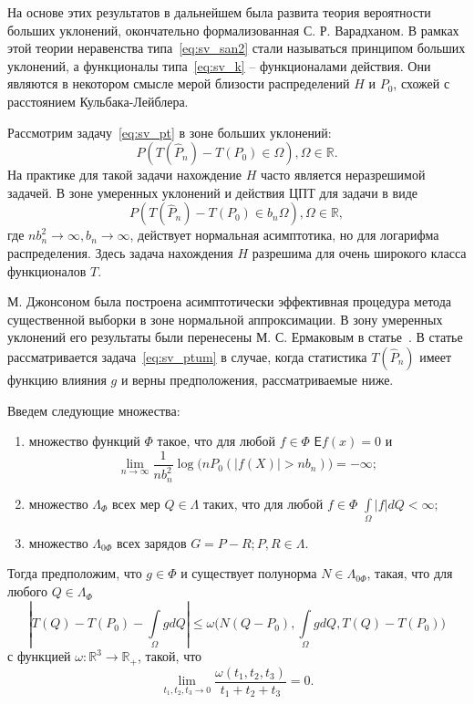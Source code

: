 \documentclass[12pt, specialist, subf, substylefile = spbu.rtx]{disser}
\newcommand{\Expect}{\mathsf{E}}
\begin{document}
На основе этих результатов в дальнейшем была развита теория вероятности больших уклонений, окончательно формализованная С. Р. Варадханом. В рамках этой теории неравенства типа~\eqref{eq:sv_san2} стали называться принципом больших уклонений, а функционалы типа~\eqref{eq:sv_k}
-- функционалами действия. Они являются в некотором смысле мерой близости распределений $H$ и $P_0$, схожей с расстоянием Кульбака-Лейблера.


Рассмотрим задачу~\eqref{eq:sv_pt} в зоне больших уклонений:
$$
P(T(\hat{P}_n)-T(P_0) \in \Omega), \Omega \in \mathbb{R}.
$$
На практике для такой задачи нахождение $H$ часто является неразрешимой задачей. В зоне умеренных уклонений и действия ЦПТ для задачи в виде
\begin{equation}\label{eq:sv_ptum}
P(T(\hat{P}_n)-T(P_0) \in b_n\Omega), \Omega \in \mathbb{R},
\end{equation}
где $nb_n^2 \to \infty, b_n \to \infty$, действует нормальная асимптотика, но для логарифма распределения. Здесь задача нахождения $H$ разрешима для очень широкого класса функционалов $T$.

М. Джонсоном была построена асимптотически эффективная процедура метода существенной выборки в зоне нормальной аппроксимации. В зону умеренных уклонений его результаты были перенесены М. С. Ермаковым в статье~\cite{Ermakov}. В статье рассматривается задача~\eqref{eq:sv_ptum} в случае, когда статистика $T(\hat{P}_n)$ имеет функцию влияния $g$ и верны предположения, рассматриваемые ниже.

Введем следующие множества: 
\begin{enumerate}
\item множество функций $\Phi$ такое, что для любой $f \in \Phi$  $\Expect f(x)=0 $ и
$$
\lim\limits_{n \to \infty} \frac{1}{nb_n^2} \log \big(nP_0(|f(X)|>nb_n)\big)=-\infty;
$$

\item множество $\Lambda_\Phi$ всех мер $Q \in \Lambda$ таких, что для любой $f \in \Phi$
$
\int\limits_{\Omega} |f| dQ < \infty;
$

\item множество $\Lambda_{0\Phi}$ всех зарядов $G=P-R; P, R \in \Lambda$.

\end{enumerate}

Тогда предположим, что $g \in \Phi$ и существует полунорма $N \in \Lambda_{0\Phi}$, такая, что для любого $Q \in \Lambda_\Phi$
$$
|T(Q)-T(P_0)-\int\limits_{\Omega}g dQ| \le 
\omega\big(N(Q-P_0), \int\limits_{\Omega}g dQ, T(Q)-T(P_0) \big)
$$
с функцией $\omega\colon \mathbb{R}^3 \to \mathbb{R}_+$, такой, что
$$
\lim\limits_{t_1, t_2, t_3 \to 0} \frac{\omega(t_1, t_2, t_3)}{t_1+ t_2+t_3} = 0.
$$
\end{document}
